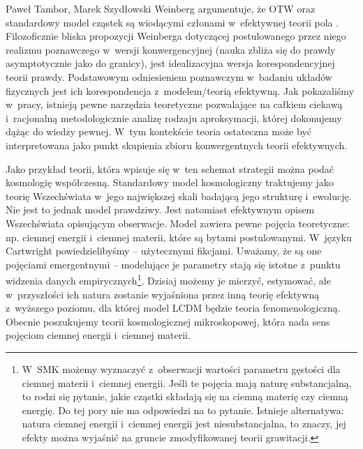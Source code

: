 \begin{artplenv2auth}{Paweł Tambor, Marek Szydłowski}
Weinberg argumentuje, że OTW oraz standardowy model cząstek są wiodącymi członami w~efektywnej teorii pola
\parencite[][]{weinberg_effective_2016}. %
 Filozoficznie bliska propozycji Weinberga dotyczącej postulowanego przez niego realizmu poznawczego w~wersji konwergencyjnej (nauka zbliża się do prawdy asymptotycznie jako do granicy), jest idealizacyjna wersja korespondencyjnej teorii prawdy. Podstawowym odniesieniem poznawczym w~badaniu układów fizycznych jest ich korespondencja z~modelem/teorią efektywną. Jak pokazaliśmy w~pracy, istnieją pewne narzędzia teoretyczne pozwalające na całkiem ciekawą i~racjonalną metodologicznie analizę rodzaju aproksymacji, której dokonujemy dążąc do wiedzy pewnej. W~tym kontekście teoria ostateczna może być interpretowana jako punkt skupienia zbioru konwergentnych teorii efektywnych.

Jako przykład teorii, która wpisuje się w~ten schemat strategii można podać kosmologię współczesną. Standardowy model kosmologiczny traktujemy jako teorię Wszechświata w~jego największej skali badającą jego strukturę i~ewolucję. Nie jest to jednak model prawdziwy. Jest natomiast efektywnym opisem Wszechświata opisującym obserwacje. Model zawiera pewne pojęcia teoretyczne: np. ciemnej energii i~ciemnej materii, które są bytami postulowanymi. W~języku Cartwright powiedzielibyśmy -- użytecznymi fikcjami. Uważamy, że są one pojęciami emergentnymi -- modelujące je parametry stają się istotne z~punktu widzenia danych empirycznych\footnote{W~SMK możemy wyznaczyć z~obserwacji wartości parametru gęstości dla ciemnej materii i~ciemnej energii. Jeśli te pojęcia mają naturę substancjalną, to rodzi się pytanie, jakie cząstki składają się na ciemną materię czy ciemną energię. Do tej pory nie ma odpowiedzi na to pytanie. Istnieje alternatywa: natura ciemnej energii i~ciemnej energii jest niesubstancjalna, to znaczy, jej efekty można wyjaśnić na gruncie zmodyfikowanej teorii grawitacji.}. Dzisiaj możemy je mierzyć, estymować, ale w~przyszłości ich natura zostanie wyjaśniona przez inną teorię efektywną z~wyższego poziomu, dla której model LCDM będzie teoria fenomenologiczną. Obecnie poszukujemy teorii kosmologicznej mikroskopowej, która nada sens pojęciom ciemnej energii i~ciemnej materii.


\end{artplenv2auth}
